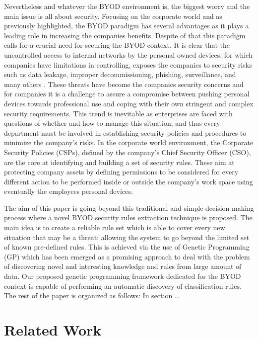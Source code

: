 \documentclass[runningheads,a4paper]{llncs}
\begin{document}
Nevertheless and whatever the BYOD environment is, the biggest worry and the main issue is all about security.
Focusing on the corporate world and as previously highlighted, the BYOD paradigm has several advantages
as it plays a leading role in increasing the
companies benefits.  Despite of that this
paradigm calls for a crucial need for securing the BYOD context. It is
clear that the uncontrolled access to internal networks by the
personal owned devices, for which companies have limitations in
controlling, exposes the companies to security risks such as data
leakage, improper decommissioning, phishing, surveillance, and many
others \cite{lennon2012changing}. These threats have become the
companies security concerns and for companies it is a challenge to
assure a compromise between pushing personal devices towards
professional use and coping with their own stringent and complex
security requirements. This trend is inevitable as enterprises are
faced with questions of whether and how to manage this situation; and
thus every department must be involved in establishing security
policies and procedures to minimize the company's risks. In the
corporate world environment, the Corporate Security Policies (CSPs),
defined by the company's Chief Security Officer (CSO), are the core at
identifying and building a set of security rules. These aim at protecting
company assets by defining permissions to be considered for every
different action to be performed inside or outside the company's work
space using eventually the employees personal devices.

The aim of this paper is going beyond this traditional and simple
decision making process where a novel  BYOD security rules extraction
technique is proposed. The main idea is to create a reliable rule set
which is able to cover every new situation that may be a threat;
allowing the system to go beyond the limited set of known pre-defined
rules. This is achieved via the use of Genetic Programming (GP) which
has been emerged as a promising approach to deal with the problem of
discovering novel and interesting knowledge and rules from large
amount of data. Our proposed genetic programming framework dedicated
for the BYOD context is capable of performing an automatic discovery
of classification rules.
The rest of the paper is organized as follows: In section \ldots

\section{Related Work}
\label{sec:SotA}
\end{document}
